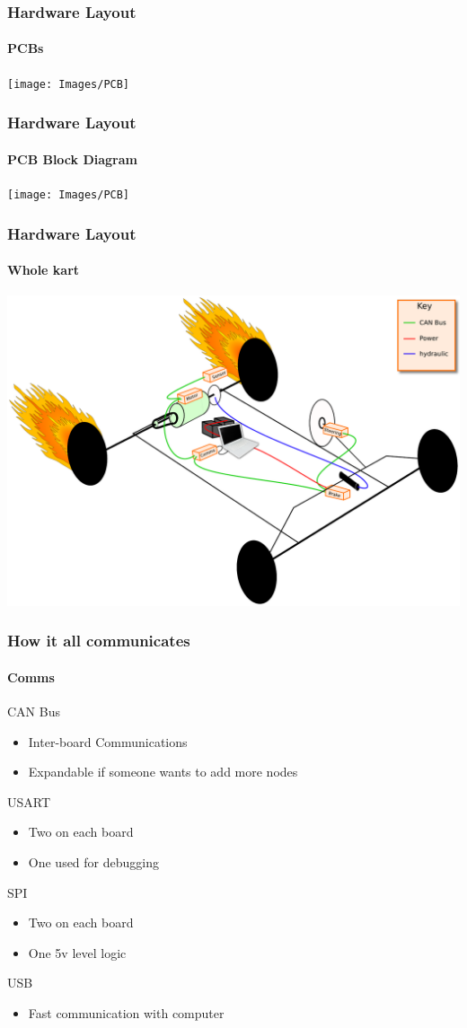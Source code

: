 \documentclass{beamer}
\begin{document}
\begin{frame}
\frametitle{Hardware Layout}
\framesubtitle{PCBs}
    \begin{center}
      \texttt{[image: Images/PCB]}
    \end{center}
\end{frame}

\begin{frame}
\frametitle{Hardware Layout}
\framesubtitle{PCB Block Diagram}
    \begin{center}
      \texttt{[image: Images/PCB]}
    \end{center}
\end{frame}

\begin{frame}
\frametitle{Hardware Layout}
\framesubtitle{Whole kart}
    \begin{center}
      \includegraphics[width=1\textwidth]{Images/layout}
    \end{center}
\end{frame}

\begin{frame}
\frametitle{How it all communicates}
\framesubtitle{Comms}
CAN Bus
\begin{itemize}
\item Inter-board Communications
\item Expandable if someone wants to add more nodes
\end{itemize}
USART
\begin{itemize}
\item Two on each board
\item One used for debugging
\end{itemize}
SPI
\begin{itemize}
\item Two on each board
\item One 5v level logic
\end{itemize}
USB
\begin{itemize}
\item Fast communication with computer
\end{itemize}
\end{frame}
\end{document}
